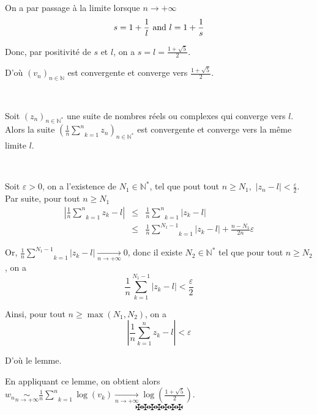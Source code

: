 On a par passage {\`a} la limite lorsque $n \rightarrow + \infty$
\[ s = 1 + \frac{1}{l} \text{ and } l = 1 + \frac{1}{s} \]


Donc, par positivit{\'e} de $s$ et $l$, on a $s = l = \frac{1 + \sqrt{5}}{2}$.

D'o{\`u} $(v_n)_{n \in \mathbb{N}}$ est convergente et converge vers $\frac{1
+ \sqrt{5}}{2} .$

\


Soit $(z_n)_{n \in \mathbb{N}^{\ast}}$ une suite de nombres r{\'e}els ou
complexes qui converge vers $l$. Alors la suite $\left( \frac{1}{n}
\underset{k = 1}{\overset{n}{\sum}} z_n \right)_{n \in \mathbb{N}^{\ast}}$ est
convergente et converge vers la m{\^e}me limite $l$.

\


Soit $\varepsilon > 0$, on a l'existence de $N_1 \in \mathbb{N}^{\ast}$, tel
que pout tout $n \geqslant N_1,$ $| z_n - l | < \frac{\varepsilon}{2}$. Par
suite, pour tout $n \geqslant N_1$
\begin{eqnarray*}
  \left| \frac{1}{n} \underset{k = 1}{\overset{n}{\sum}} z_k - l \right| &
  \leqslant & \frac{1}{n} \underset{k = 1}{\overset{n}{\sum}} | z_k - l |\\
  & \leqslant & \frac{1}{n} \underset{k = 1}{\overset{N_1 - 1}{\sum}} | z_k -
  l | + \frac{n - N_1}{2 n} \varepsilon
\end{eqnarray*}


Or, $\frac{1}{n} \underset{k = 1}{\overset{N_1 - 1}{\sum}} | z_k - l |
\underset{n \longrightarrow + \infty}{\longrightarrow} 0$, donc il existe $N_2
\in \mathbb{N}^{\ast}$ tel que pour tout $n \geqslant N_2$, on a
\[ \frac{1}{n} \underset{k = 1}{\overset{N_1 - 1}{\sum}} | z_k - l | <
   \frac{\varepsilon}{2} \]


Ainsi, pour tout $n \geqslant \max (N_1, N_2)$, on a
\[ \left| \frac{1}{n} \underset{k = 1}{\overset{n}{\sum}} z_k - l \right| <
   \varepsilon \]


D'o{\`u} le lemme.

En appliquant ce lemme, on obtient alors $w_n \underset{n \longrightarrow +
\infty}{\sim} \frac{1}{n} \underset{k = 1}{\overset{n}{\sum}} \log (v_k)
\underset{n \longrightarrow + \infty}{\longrightarrow} \log \left( \frac{1 +
\sqrt{5}}{2} \right)$.
\[ \maltese \maltese \maltese \maltese \maltese \maltese \maltese \]
